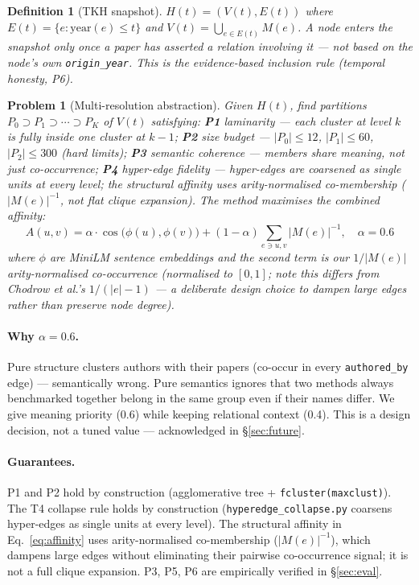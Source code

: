 \documentclass[10pt]{article}
\newtheorem{definition}{Definition}
\newtheorem{problem}{Problem}
\begin{document}
\begin{definition}[TKH snapshot]
$H(t) = (V(t), E(t))$ where $E(t) = \{e : \mathrm{year}(e) \le t\}$ and
$V(t) = \bigcup_{e \in E(t)} M(e)$.
A node enters the snapshot only once a paper has asserted a relation involving it —
not based on the node's own \texttt{origin\_year}.
This is the \emph{evidence-based inclusion} rule (temporal honesty, P6).
\end{definition}

\begin{problem}[Multi-resolution abstraction]
Given $H(t)$, find partitions $P_0 \supset P_1 \supset \cdots \supset P_K$ of
$V(t)$ satisfying:
\textbf{P1} laminarity — each cluster at level $k$ is fully inside one cluster at
$k{-}1$;
\textbf{P2} size budget — $|P_0|\le12$, $|P_1|\le60$, $|P_2|\le300$ (hard limits);
\textbf{P3} semantic coherence — members share meaning, not just co-occurrence;
\textbf{P4} hyper-edge fidelity — hyper-edges are coarsened as single units at
every level; the structural affinity uses arity-normalised co-membership
($|M(e)|^{-1}$, not flat clique expansion).
The method maximises the combined affinity:
\begin{equation}
  A(u,v) = \alpha \cdot \cos\!\bigl(\phi(u),\phi(v)\bigr)
          + (1-\alpha)\sum_{e \ni u,v} |M(e)|^{-1}, \quad \alpha = 0.6
  \label{eq:affinity}
\end{equation}
where $\phi$ are MiniLM sentence embeddings and the second term is our
$1/|M(e)|$ arity-normalised co-occurrence (normalised to $[0,1]$; note this
differs from Chodrow et al.'s $1/(|e|-1)$ — a deliberate design choice to
dampen large edges rather than preserve node degree).
\end{problem}

\paragraph{Why $\alpha=0.6$.}
Pure structure clusters authors with their papers (co-occur in every
\texttt{authored\_by} edge) — semantically wrong.
Pure semantics ignores that two methods always benchmarked together belong in
the same group even if their names differ.
We give meaning priority (0.6) while keeping relational context (0.4).
This is a design decision, not a tuned value — acknowledged in §\ref{sec:future}.

\paragraph{Guarantees.}
P1 and P2 hold by construction (agglomerative tree + \texttt{fcluster(maxclust)}).
The T4 collapse rule holds by construction (\texttt{hyperedge\_collapse.py} coarsens
hyper-edges as single units at every level).
The structural affinity in Eq.~\ref{eq:affinity} uses arity-normalised
co-membership ($|M(e)|^{-1}$), which dampens large edges without eliminating
their pairwise co-occurrence signal; it is not a full clique expansion.
P3, P5, P6 are empirically verified in §\ref{sec:eval}.
\end{document}
